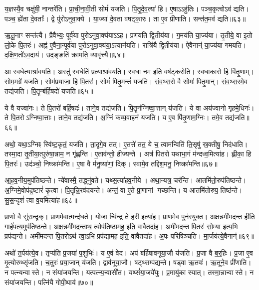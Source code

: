 य॒ज्ञस्यै॒व चक्षु॑षी॒ नान्तरे॑ति।
प्रा॒ची॒ना॒वी॒ती सोमं॑ यजति।
पि॒तृ॒दे॒व॒त्या॑ हि।
ए॒षाऽऽहु॑तिः।
पञ्च॒कृत्वोऽव॑ द्यति।
पञ्च॒ ह्ये॑ता दे॒वताः᳚।
द्वे पु॑रो\-ऽनुवा॒क्ये।
या॒ज्या॑ दे॒वता॑ वषट्का॒रः।
ता ए॒व प्री॑णाति।
सन्त॑त॒मव॑ द्यति॥६३॥

ऋ॒तू॒नाꣳ सन्त॑त्यै।
प्रैवैभ्यः॒ पूर्व॑या पुरो\-ऽनुवा॒क्य॑याऽऽह।
प्रण॑यति द्वि॒तीय॑या।
ग॒मय॑ति या॒ज्य॑या।
तृ॒तीये॒ वा इ॒तो लो॒के पि॒तरः॑।
अह्न॑ ए॒वैना॒न्पूर्व॑या पुरो\-ऽनुवा॒क्य॑या॒\-ऽत्यान॑यति।
रात्रि॑यै द्वि॒तीय॑या।
ऐवैनान्॑ या॒ज्य॑या गमयति।
द॒क्षि॒ण॒तो॑\-ऽव॒दाय॑।
उद॒ङ्ङति॑ क्रामति॒ व्यावृ॑त्त्यै॥६४॥

आ स्व॒धेत्याश्रा॑वयति।
अस्तु॑ स्व॒धेति॑ प्र॒त्याश्रा॑वयति।
स्व॒धा नम॒ इति॒ वष॑ट्करोति।
स्व॒धा॒का॒रो हि पि॑तृ॒णाम्।
सोम॒मग्रे॑ यजति।
सोम॑प्रयाजा॒ हि पि॒तरः॑।
सोमं॑ पितृ॒मन्तं॑ यजति।
सं॒व॒थ्स॒रो वै सोमः॑ पितृ॒मान्।
सं॒व॒थ्स॒रमे॒व तद्य॑जति।
पि॒तॄन्ब॑र्हि॒षदो॑ यजति॥६५॥

ये वै यज्वा॑नः।
ते पि॒तरो॑ बर्\mbox{}हि॒षदः॑।
ताने॒व तद्य॑जति।
पि॒तॄन॑ग्निष्वा॒त्तान् य॑जति।
ये वा अय॑ज्वानो गृहमे॒धिनः॑।
ते पि॒तरो\-ऽग्निष्वा॒त्ताः।
ताने॒व तद्य॑जति।
अ॒ग्निं क॑व्य॒वाह॑नं यजति।
य ए॒व पि॑तृ॒णाम॒ग्निः।
तमे॒व तद्य॑जति॥६६॥

अथो॒ यथा॒\-ऽग्निꣴ स्वि॑ष्ट॒कृतं॒ यज॑ति।
ता॒दृगे॒व तत्।
ए॒तत्ते॑ तत॒ ये च॒ त्वामन्विति॑ ति॒सृषु॑ स्र॒क्तीषु॒ निद॑धाति।
तस्मा॒दा तृ॒तीया॒त्पुरु॑षा॒न्नाम॒ न गृ॑ह्णन्ति।
ए॒ताव॑न्तो॒ हीज्यन्ते।
अत्र॑ पितरो यथाभा॒गं म॑न्दध्व॒मित्या॑ह।
ह्लीका॒ हि पि॒तरः॑।
उद॑ञ्चो॒ निष्क्रा॑मन्ति।
ए॒षा वै म॑नु॒ष्या॑णां॒ दिक्।
स्वामे॒व तद्दिश॒मनु॒ निष्क्रा॑मन्ति॥६७॥

आ॒ह॒व॒नीय॒मुप॑तिष्ठन्ते।
न्ये॑वास्मै॒ तद्ध्नु॑वते।
यथ्स॒त्या॑हव॒नीये।
अथा॒न्यत्र॒ चर॑न्ति।
आतमि॑तो॒रुप॑तिष्ठन्ते।
अ॒ग्निमे॒वोप॑द्र॒ष्टारं॑ कृ॒त्वा।
पि॒तॄन्नि॒रव॑दयन्ते।
अन्तं॒ वा ए॒ते प्रा॒णानां गच्छन्ति।
य आतमि॑तोरुप॒ तिष्ठ॑न्ते।
सु॒स॒न्दृशं॑ त्वा व॒यमित्या॑ह॥६८॥

प्रा॒णो वै सु॑स॒न्दृक्।
प्रा॒णमे॒वात्मन्द॑धते।
योजा॒ न्वि॑न्द्र ते॒ हरी॒ इत्या॑ह।
प्रा॒णमे॒व पुन॑रयुक्त।
अक्ष॒न्नमी॑मदन्त॒ हीति॒ गार्\mbox{}ह॑पत्य॒मुप॑तिष्ठन्ते।
अक्ष॒न्नमी॑मद॒न्ताथ॒ त्वोप॑तिष्ठामह॒ इति॒ वावैतदा॑ह।
अमी॑मदन्त पि॒तरः॑ सो॒म्या इत्य॒भि प्रप॑द्यन्ते।
अमी॑मदन्त पि॒तरोऽथ॑ त्वा॒ऽभि प्रप॑द्यामह॒ इति॒ वावैतदा॑ह।
अ॒पः परि॑षिञ्चति।
मा॒र्जय॑त्ये॒वैनान्॑॥६९॥

अथो॑ त॒र्पय॑त्ये॒व।
तृप्य॑ति प्र॒जया॑ प॒शुभिः॑।
य ए॒वं वेद॑।
अप॑ बर्\mbox{}हिषावनूया॒जौ य॑जति।
प्र॒जा वै ब॒र्॒हिः।
प्र॒जा ए॒व मृ॒त्योरुथ्सृ॑जति।
च॒तुरः॑ प्रया॒जान् य॑जति।
द्वाव॑नूया॒जौ।
षट्थ्सम्प॑द्यन्ते।
षड्वा ऋ॒तवः॑।
ऋ॒तूने॒व प्री॑णाति।
न पत्न्यन्वास्ते।
न संया॑जयन्ति।
यत्पत्न्य॒न्वासी॑त।
यथ्सं॑या॒जये॑युः।
प्र॒मायु॑का स्यात्।
तस्मा॒न्नान्वास्ते।
न संया॑जयन्ति।
पत्नि॑यै गोपी॒थाय॑॥७०॥

